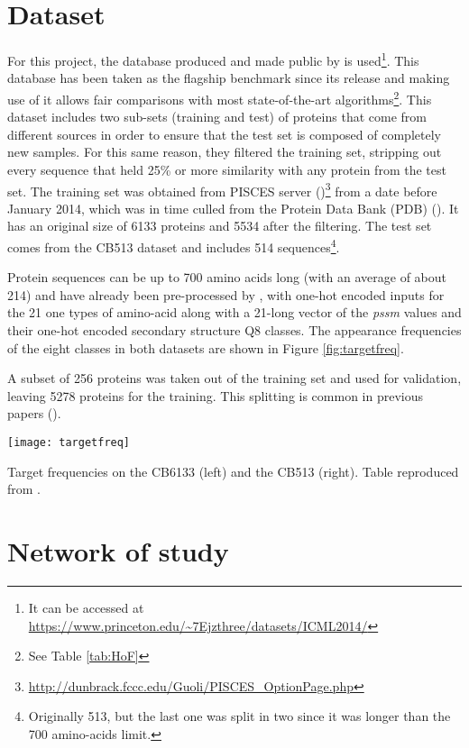 \section{Dataset}
For this project, the database produced and made public by \cite{Zhou2014} is used\footnote{It can be accessed at \url{https://www.princeton.edu/\~7Ejzthree/datasets/ICML2014/}}. This database has been taken as the flagship benchmark since its release and making use of it allows fair comparisons with most state-of-the-art algorithms\footnote{See Table \ref{tab:HoF}}. This dataset includes two sub-sets (training and test) of proteins that come from different sources in order to ensure that the test set is composed of completely new samples. For this same reason, they filtered the training set, stripping out every sequence that held 25\% or more similarity with any protein from the test set.
The training set was obtained from PISCES server (\cite{Wang2003})\footnote{\url{http://dunbrack.fccc.edu/Guoli/PISCES\_OptionPage.php}} from a date before January 2014, which was in time culled from the Protein Data Bank (PDB) (\cite{Berman2003}).
It has an original size of 6133 proteins and 5534 after the filtering. The test set comes from the CB513 dataset \cite{Cuff1999} and includes 514 sequences\footnote{Originally 513, but the last one was split in two since it was longer than the 700 amino-acids limit.}.

Protein sequences can be up to 700 amino acids long (with an average of about 214) and have already been pre-processed by \cite{Zhou2014}, with one-hot encoded inputs for the 21 one types of amino-acid along with a 21-long vector of the \textit{pssm} values and their one-hot encoded secondary structure Q8 classes. The appearance frequencies of the eight classes in both datasets are shown in Figure \ref{fig:targetfreq}.

A subset of 256 proteins was taken out of the training set and used for validation, leaving 5278 proteins for the training. This splitting is common in previous papers (\cite{Zhou2014,Sønderby2014,Busia2017,Jurtz2017,Hattori2017}).

\begin{table}[h]
	\centering
	\texttt{[image: targetfreq]}
	\caption{Target frequencies on the CB6133 (left) and the CB513 (right). Table reproduced from \cite{Hattori2017}.}
	\label{fig:targetfreq}
\end{table}


\section{Network of study}\label{sect:network}

